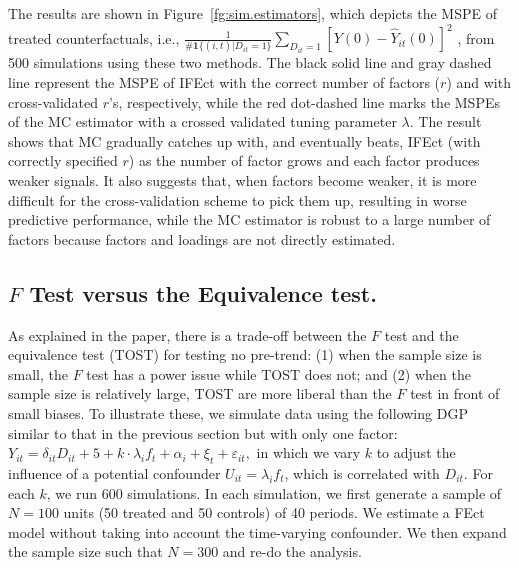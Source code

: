 \documentclass[12pt]{article}
\begin{document}
The results are shown in Figure~\ref{fg:sim.estimators}, which depicts the MSPE of treated counterfactuals, i.e., $\frac{1}{\#\mathbf{1}\{(i,t)| D_{it}=1\}}\sum_{D_{it} = 1} [Y(0) - \hat{Y}_{it}(0)]^{2}$ , from 500 simulations using these two methods. The black solid line and gray dashed line represent the MSPE of IFEct with the correct number of factors ($r$) and with cross-validated $r$'s, respectively, while the red dot-dashed line marks the MSPEs of the MC estimator with a crossed validated tuning parameter $\lambda$. The result shows that MC gradually catches up with, and eventually beats, IFEct (with correctly specified $r$) as the number of factor grows and each factor produces weaker signals. It also suggests that, when factors become weaker, it is more difficult for the cross-validation scheme to pick them up, resulting in worse predictive performance, while the MC estimator is robust to a large number of factors because factors and loadings are not directly estimated. 
\bigskip

\subsection{$F$ Test versus the Equivalence test.} 

As explained in the paper, there is a trade-off between the $F$ test and the equivalence test (TOST) for testing no pre-trend: (1) when the sample size is small, the $F$ test has a power issue while TOST does not; and (2) when the sample size is relatively large, TOST are more liberal than the $F$ test in front of small biases. To illustrate these, we simulate data using the following DGP similar to that in the previous section but with only one factor: $Y_{it} = \delta_{it} D_{it} + 5 + k \cdot \lambda_{i}  f_{t} + \alpha_{i} + \xi_{t} + \varepsilon_{it},$ in which we vary $k$ to adjust the influence of a potential confounder $U_{it} = \lambda_{i} f_{t}$, which is correlated with $D_{it}$. For each $k$, we run 600 simulations. In each simulation, we first generate a sample of $N = 100$ units (50 treated and 50 controls) of 40 periods. We estimate a FEct model without taking into account the time-varying confounder. We then expand the sample size such that $N = 300$ and re-do the analysis.
\end{document}

